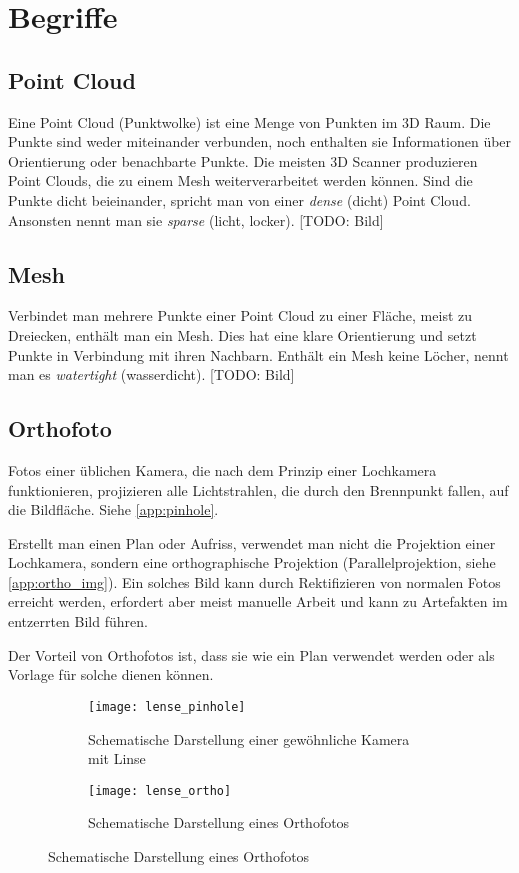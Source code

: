 \chapter{Begriffe}
		\section{Point Cloud}\label{app:point_cloud}
			Eine Point Cloud (Punktwolke) ist eine Menge von Punkten im 3D Raum. Die Punkte sind weder miteinander verbunden, noch enthalten sie Informationen über Orientierung oder benachbarte Punkte. Die meisten 3D Scanner produzieren Point Clouds, die zu einem Mesh weiterverarbeitet werden können.
			Sind die Punkte dicht beieinander, spricht man von einer \emph{dense} (dicht) Point Cloud. Ansonsten nennt man sie \emph{sparse} (licht, locker).
			[TODO: Bild]
		
		\section{Mesh}\label{app:mesh}
			Verbindet man mehrere Punkte einer Point Cloud zu einer Fläche, meist zu Dreiecken, enthält man ein Mesh. Dies hat eine klare Orientierung und setzt Punkte in Verbindung mit ihren Nachbarn. Enthält ein Mesh keine Löcher, nennt man es \emph{watertight} (wasserdicht).
			[TODO: Bild]
		
		\section{Orthofoto} \label{app:orthofoto}
			Fotos einer üblichen Kamera, die nach dem Prinzip einer Lochkamera funktionieren, projizieren alle Lichtstrahlen, die durch den Brennpunkt fallen, auf die Bildfläche. Siehe \autoref{app:pinhole}.
			
			Erstellt man einen Plan oder Aufriss, verwendet man nicht die Projektion einer Lochkamera, sondern eine orthographische Projektion (Parallelprojektion, siehe \autoref{app:ortho_img}). Ein solches Bild kann durch Rektifizieren von normalen Fotos erreicht werden, erfordert aber meist manuelle Arbeit und kann zu Artefakten im entzerrten Bild führen.
			
			Der Vorteil von Orthofotos ist, dass sie wie ein Plan verwendet werden oder als Vorlage für solche dienen können.
			
			\begin{figure}
				\begin{subfigure}{0.5\linewidth}
					\texttt{[image: lense\_pinhole]}
					\caption{Schematische Darstellung einer gewöhnliche Kamera mit Linse}
					\label{app:pinhole}
				\end{subfigure}
				\hspace{0.2\linewidth}
				\begin{subfigure}{0.5\linewidth}
					\texttt{[image: lense\_ortho]}
					\caption{Schematische Darstellung eines Orthofotos}
					\label{app:ortho_img}
				\end{subfigure}
			\end{figure}

